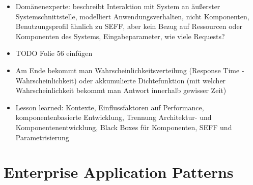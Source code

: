 \documentclass[paper=a4, fontsize=11pt]{scrartcl} %
\numberwithin{equation}{section} %
\numberwithin{figure}{section} %
\numberwithin{table}{section} %
\begin{document}
\begin{itemize}
\begin{itemize}
\begin{itemize}
      \item Domänenexperte: beschreibt Interaktion mit System an äußerster Systemschnittstelle, modelliert Anwendungsverhalten, nicht Komponenten, Benutzungsprofil ähnlich zu SEFF, aber kein Bezug auf Ressourcen oder Komponenten des Systems, Eingabeparameter, wie viele Requests?
      \item TODO Folie 56 einfügen
      \item Am Ende bekommt man Wahrscheinlichkeitsverteilung (Response Time - Wahrscheinlichkeit) oder akkumulierte Dichtefunktion (mit welcher Wahrscheinlichkeit bekommt man Antwort innerhalb gewisser Zeit)
      \item Lesson learned: Kontexte, Einflussfaktoren auf Performance, komponentenbasierte Entwicklung, Trennung Architektur- und Komponentenentwicklung, Black Boxes für Komponenten, SEFF und Parametrisierung
    \end{itemize}
  \end{itemize}
\end{itemize}

\section{Enterprise Application Patterns}
\end{document}
